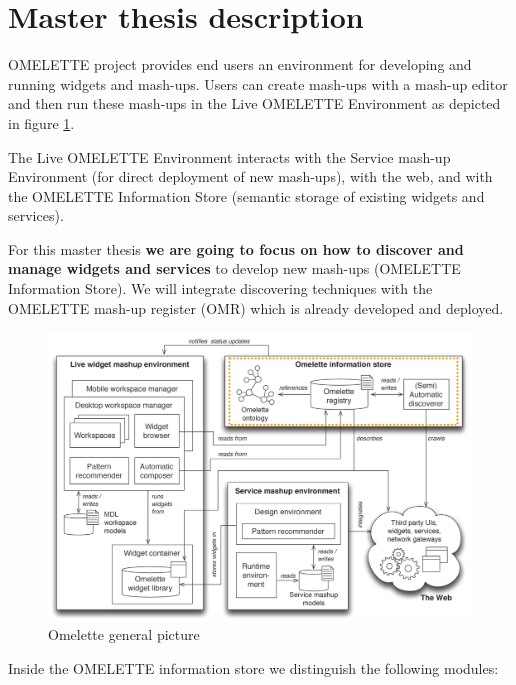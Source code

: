 \section{Master thesis description}

OMELETTE project provides end users an environment for developing and running widgets and mash-ups.  Users can create mash-ups with a mash-up editor and then run these mash-ups in the Live OMELETTE Environment as depicted in figure \ref{fig:generalpicture}.

The Live OMELETTE Environment interacts with the Service mash-up Environment (for direct deployment of new mash-ups), with the web, and with the OMELETTE Information Store (semantic storage of existing widgets and services).

For this master thesis \textbf{we are going to focus on how to discover and manage widgets and services} to develop new mash-ups (OMELETTE Information Store). We will integrate discovering techniques with the OMELETTE mash-up register (OMR) which is already developed and deployed.

\begin{figure}[ht]
	\centering
	\includegraphics[width=400pt]{graphics/omelettegeneral.png}
	\caption{Omelette general picture}
	\label{fig:generalpicture}
\end{figure}

Inside the OMELETTE information store we distinguish the following modules:

